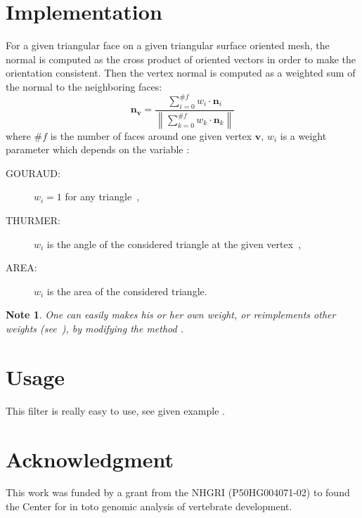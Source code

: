 \documentclass{InsightArticle}
\theoremstyle{plain}
\newtheorem*{note}{Note}
\begin{document}
\section{Implementation}
For a given triangular face on a given triangular surface oriented mesh, the normal is computed as the cross product of oriented vectors in order to make the orientation consistent. Then the vertex normal is computed as a weighted sum of the normal to the neighboring faces:
\begin{equation}
  \mathbf{n}_{\mathbf{v}} = \frac{\sum\limits_{i=0}^{\#f} w_i \cdot \mathbf{n}_i}{\left\|\sum\limits_{k=0}^{\#f} w_k \cdot \mathbf{n}_k \right\|}
\end{equation}
where $\#f$ is the number of faces around one given vertex $\mathbf{v}$, $w_i$ is a weight parameter which depends on the variable :
\begin{description}
  \item[GOURAUD: ] $w_i=1$ for any triangle~\cite{Gouraud71},
  \item[THURMER: ] $w_i$ is the angle of the considered triangle at the given vertex~\cite{Thurmer98},
  \item[AREA: ] $w_i$ is the area of the considered triangle.
 \end{description}

\begin{note}
  One can easily makes his or her own weight, or reimplements other weights (see~\cite{Jin05}), by modifying the method .
\end{note}

\section{Usage}
This filter is really easy to use, see given example .

\section*{Acknowledgment}
This work was funded by a grant from the NHGRI (P50HG004071-02) to found the Center for in toto genomic analysis of vertebrate development.



\end{document}
